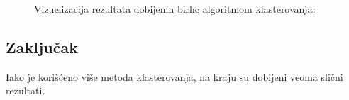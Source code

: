 \documentclass{article}
\begin{document}
\begin{figure}[!h]
    \centering
    \caption{ Vizuelizacija rezultata dobijenih birhc algoritmom klasterovanja: }
    \label{fig:best_birch}
\end{figure}

\subsection{Zaključak}

Iako je korišćeno više metoda klasterovanja, na kraju su dobijeni veoma slični rezultati. 


  

\end{document}
